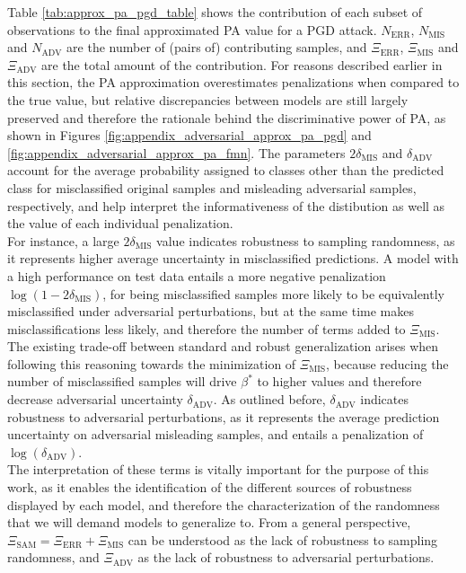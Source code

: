 Table \ref{tab:approx_pa_pgd_table} shows the contribution of each subset of observations to the final
approximated PA value for a PGD attack. $N_{\text{ERR}}$, $N_{\text{MIS}}$ and $N_{\text{ADV}}$ are the number of (pairs of)
contributing samples, and $\Xi_{\text{ERR}}$, $\Xi_{\text{MIS}}$ and $\Xi_{\text{ADV}}$ are
the total amount of the contribution. For reasons described earlier in this section,
the PA approximation overestimates penalizations when compared to the true value, but
relative discrepancies between models are still largely preserved and therefore the rationale
behind the discriminative power of PA, as shown in Figures \ref{fig:appendix_adversarial_approx_pa_pgd}
and \ref{fig:appendix_adversarial_approx_pa_fmn}. The parameters $2 \delta_{\text{MIS}}$ and
$\delta_{\text{ADV}}$ account for the average probability assigned to classes other than the predicted
class for misclassified original samples and misleading adversarial samples, respectively, and 
help interpret the informativeness of the distibution as well as the value of each individual 
penalization. \\

For instance, a large $2 \delta_{\text{MIS}}$ value indicates robustness to sampling randomness, as it
represents higher average uncertainty in misclassified predictions. A model with a high performance on 
test data entails a more negative penalization $\log(1 - 2 \delta_{\text{MIS}})$, for being misclassified 
samples more likely to be equivalently misclassified under adversarial perturbations, but at
the same time makes misclassifications less likely, and therefore the number of terms added to
$\Xi_{\text{MIS}}$. The existing trade-off between standard and robust generalization arises when 
following this reasoning towards the minimization of $\Xi_{\text{MIS}}$, because reducing the number of 
misclassified samples will drive $\beta^{*}$ to higher values and therefore decrease adversarial 
uncertainty $\delta_{\text{ADV}}$. As outlined before, $\delta_{\text{ADV}}$ indicates 
robustness to adversarial perturbations, as it represents the average prediction uncertainty on adversarial 
misleading samples, and entails a penalization of $\log(\delta_{\text{ADV}})$. \\

The interpretation of these terms is vitally important for the purpose of this work, as it enables
the identification of the different sources of robustness displayed by each model, and therefore
the characterization of the randomness that we will demand models to generalize to. From a general 
perspective, $\Xi_{\text{SAM}} = \Xi_{\text{ERR}} + \Xi_{\text{MIS}}$ can be understood as the lack of robustness
to sampling randomness, and $\Xi_{\text{ADV}}$ as the lack of robustness to adversarial perturbations. \\


